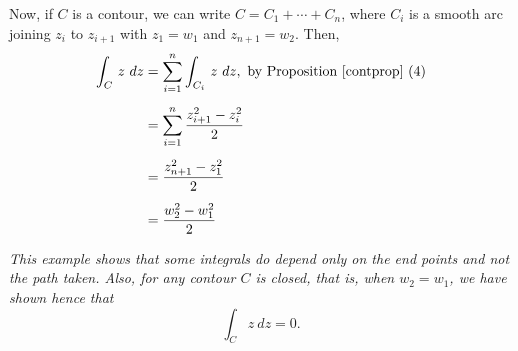 \begin{example}
\begin{itemize}[itemsep=1.5em]

\vspace*{1em}

Now, if $C$ is a contour, we can write $C = C_1 + \cdots + C_n$, where $C_i$ is a smooth arc joining $z_i$ to $z_{i+ 1}$ with $z_1 = w_1$ and $z_{n+1} = w_2$. Then,
\begin{align*}
\int_C\,z\ dz &= \sum_{i=1}^n\int_{C_i}\,z\ dz,\ \text{by Proposition \ref{contprop} (4)}\\[0.5em]
 &= \sum_{i=1}^n \frac{z_{i+1}^2 - z_i^2}{2}\\[0.5em]
 &= \frac{z_{n+1}^2 - z_1^2}{2}\\[0.5em]
 &= \frac{w_2^2 - w_1^2}{2}
\end{align*}

\emph{This example shows that some integrals do depend only on the end points and not the path taken. Also, for any contour $C$ is closed, that is, when $w_2 = w_1$, we have shown hence that
\[\int_C z\ dz = 0.\]}


\end{itemize}
\end{example}

